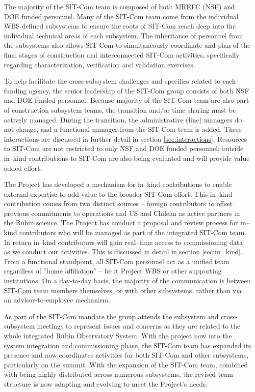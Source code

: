 \documentclass[SE,lsstdraft,authoryear,toc]{lsstdoc}
\begin{document}
The majority of the SIT-Com team is composed of both MREFC (NSF) and DOE funded personnel.
Many of the SIT-Com team come from the individual WBS defined subsystems to ensure the roots of SIT-Com reach deep into the individual technical areas of each subsystem. 
The inheritance of personnel from the subsystems also allows SIT-Com to simultaneously coordinate and plan of the final stages of construction and interconnected SIT-Com activities, specifically regarding characterization, verification and validation exercises.

To help facilitate the cross-subsystem challenges and specifics related to each funding agency, the senior leadership of the SIT-Com group consists of both NSF and DOE funded personnel.
Because majority of the SIT-Com team are also part of construction subsystem teams, the transition and/or time sharing must be actively managed.
During the transition, the administrative (line) managers do not change, and a functional manager from the SIT-Com team is added.
These interactions are discussed in further detail in section \ref{sec:interactions}.
Resources to SIT-Com are not restricted to only NSF and DOE funded personnel; outside in--kind contributions to SIT-Com are also being evaluated and will provide value added effort.

The Project has developed a mechanism for in--kind contributions to enable external expertise to add value to the broader SIT-Com effort.
This in--kind contribution comes from two distinct sources -- foreign contributors to offset previous commitments to operations and US and Chilean as active partners in the Rubin science.
The Project has conduct a proposal and review process for in--kind contributors who will be managed as part of the integrated SIT-Com team.
In return in--kind contributors will gain real--time access to commissioning data as we conduct our activities.
This is discussed in detail in section \ref{sec:in_kind}.
From a functional standpoint, all SIT-Com personnel act as a unified team regardless of ''home affiliation'' -- be it Project WBS or other supporting institutions.
On a day-to-day basis, the majority of the communication is between SIT-Com team members themselves, or with other subsystems, rather than via an advisor-to-employee mechanism.

As part of the SIT-Com mandate the group attends the subsystem and cross-subsystem meetings to represent issues and concerns as they are related to the whole integrated Rubin Observatory System.
With the project now into the system integration and commissioning phase, the SIT-Com team has expanded its presence and now coordinates activities for both SIT-Com and other subsystems, particularly on the summit.
With the expansion of the SIT-Com team, combined with being highly distributed across numerous subsystems, the revised team structure is now adapting and evolving to meet the Project's needs.
\end{document}
